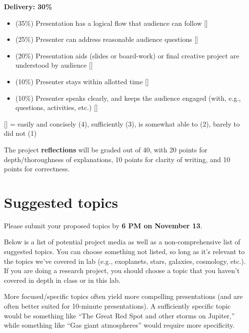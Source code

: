 \documentclass[11pt]{article}
\begin{document}
\noindent
\textbf{Delivery: 30\%}
\begin{itemize}
\item (35\%) Presentation has a logical flow that audience can follow [\underline{\hspace{5mm}}]
\item (25\%) Presenter can address reasonable audience questions [\underline{\hspace{5mm}}]
\item (20\%) Presentation aids (slides or board-work) or final creative project are understood by audience [\underline{\hspace{5mm}}]
\item (10\%) Presenter stays within allotted time [\underline{\hspace{5mm}}]
\item (10\%) Presenter speaks clearly, and keeps the audience engaged (with, e.g., questions, activities, etc.) [\underline{\hspace{5mm}}]
\end{itemize}
{\small [\underline{\hspace{5mm}}] = easily and concisely (4), sufficiently (3),
is somewhat able to (2), barely to did not (1)
}

\bigskip \bigskip
\noindent
The project \textbf{reflections} will be graded out of 40, with 20 points for depth/thoroughness of explanations, 10 points for clarity of writing, and 10 points for correctness.

\section{Suggested topics}

Please submit your proposed topics by \textbf{6 PM on November 13}. \bigskip
 
 \noindent
 Below is a list of potential project media as well as a non-comprehensive list of suggested topics.  You can choose something not listed, so long as it's relevant to the topics we've covered in lab (e.g., exoplanets, stars, galaxies, cosmology, etc.). If you are doing a research project, you should choose a topic that you haven't covered in depth in class or in this lab.

\medskip \noindent
More focused/specific topics often yield more compelling presentations (and are often better suited for 10-minute presentations). A sufficiently specific topic would be something like ``The Great Red Spot and other storms on Jupiter,'' while something like ``Gas giant atmospheres'' would require more specificity.
\end{document}
